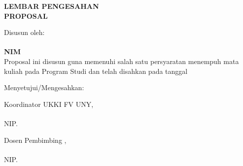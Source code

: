 

\newpage
{}
\begin{center}
    \begin{doublespace}
        \textbf{\large \MakeUppercase{lembar pengesahan}}\\
        \textbf{\large \MakeUppercase{Proposal {\tipe}}}
    \end{doublespace}
\end{center}

\begin{center}
    \begin{doublespace}
        \textbf{\large \MakeUppercase {\judulid}}
    \end{doublespace}
\end{center}

\begin{center}
    Disusun oleh:\\
    \textbf{\penulis}\\
    \textbf{NIM \nim}\\[1.5cm]

    Proposal ini disusun guna memenuhi salah satu persyaratan menempuh mata kuliah {\tipe} pada Program Studi {\prodi} {\fakultas} {\universitas} dan telah disahkan pada tanggal \tglpengesahan\\[0.75cm]
\end{center}

\begin{center}
    Menyetujui/Mengesahkan:\\[2cm]
\end{center}

\begin{minipage}{0.47\textwidth}
    \centering
    Koordinator UKKI {\prodi} FV UNY,\\[3cm]
    \koordinatorUKKI\\
    NIP. \NIPkoordinatorUKKI
\end{minipage}
\hfill
\begin{minipage}{0.45\textwidth}
    \centering
    Dosen Pembimbing {\tipe},\\[3cm]
    \pembimbing\\
    NIP. \NIPpembimbing
\end{minipage}

